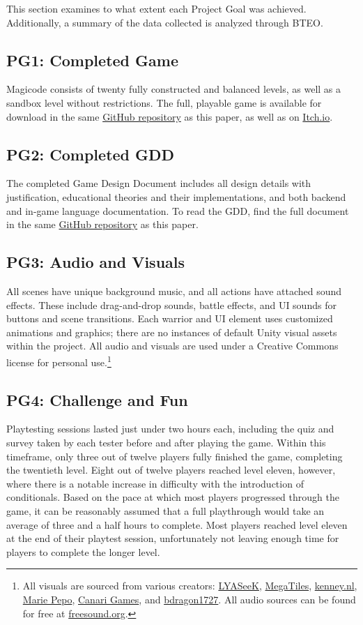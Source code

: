 \documentclass[10pt,twocolumn]{article}
\begin{document}
This section examines to what extent each Project Goal was achieved. Additionally, a summary of the data collected is analyzed through BTEO.

\subsection{PG1: Completed Game}
Magicode consists of twenty fully constructed and balanced levels, as well as a sandbox level without restrictions. The full, playable game is available for download in the same \href{https://github.com/slevy14/Comps-Game}{GitHub repository} as this paper, as well as on \href{https://leafguy.itch.io/magicode}{Itch.io}.

\subsection{PG2: Completed GDD}
The completed Game Design Document includes all design details with justification, educational theories and their implementations, and both backend and in-game language documentation. To read the GDD, find the full document in the same \href{https://github.com/slevy14/Comps-Game}{GitHub repository} as this paper.

\subsection{PG3: Audio and Visuals}
All scenes have unique background music, and all actions have attached sound effects. These include drag-and-drop sounds, battle effects, and UI sounds for buttons and scene transitions. Each warrior and UI element uses customized animations and graphics; there are no instances of default Unity visual assets within the project. All audio and visuals are used under a Creative Commons license for personal use.\footnote{All visuals are sourced from various creators: \href{https://lyaseek.itch.io/}{LYASeeK}, \href{https://megatiles.itch.io/}{MegaTiles}, \href{http://kenney.nl}{kenney.nl}, \href{https://marie-pepo.itch.io/mf-items}{Marie Pepo}, \href{https://canarigames.itch.io/canaripack-8bit-topdown}{Canari Games}, and \href{https://bdragon1727.itch.io/basic-pixel-health-bar-and-scroll-bar}{bdragon1727}. All audio sources can be found for free at \href{https://freesound.org/}{freesound.org}.}

\subsection{PG4: Challenge and Fun}
Playtesting sessions lasted just under two hours each, including the quiz and survey taken by each tester before and after playing the game. Within this timeframe, only three out of twelve players fully finished the game, completing the twentieth level. Eight out of twelve players reached level eleven, however, where there is a notable increase in difficulty with the introduction of conditionals. Based on the pace at which most players progressed through the game, it can be reasonably assumed that a full playthrough would take an average of three and a half hours to complete. Most players reached level eleven at the end of their playtest session, unfortunately not leaving enough time for players to complete the longer level.
\end{document}
